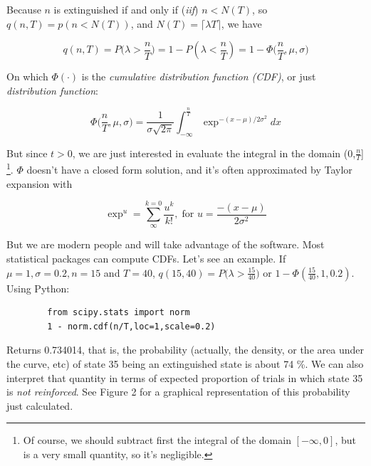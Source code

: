 \documentclass[11pt]{article}
\begin{document}
Because $n$ is extinguished if and only if (\textit{iif}) $n < N(T)$, so $q(n,T) = p(n < N(T))$,
and $N(T) = \lceil \lambda T \rceil$, we have

    \[
        q(n,T) = P \Big(\lambda > \frac{n}{T}\Big) = 1 - P(\lambda < \frac{n}{T}) = 1 - \Phi \Big (\frac{n}{T}, \mu, \sigma \Big)
    \]


On which $\Phi (\cdot)$ is the \textit{cumulative distribution function (CDF)}, or just \textit{distribution function}:

    \[
        \Phi \Big( \frac{n}{T}, \mu, \sigma \Big) = \frac{1}{\sigma \sqrt{2 \pi}} \int_{-\infty}^{\frac{n}{T}} \exp^{-(x - \mu)/2\sigma^2}dx
    \]

But since $t > 0$, we are just interested in evaluate the integral in the domain (0,$\frac{n}{T}$] \footnote{Of course,
    we should subtract first the integral of the domain $[-\infty, 0]$, but is a very small quantity, so it's negligible.}.
$\Phi$ doesn't have a closed form solution, and it's often approximated by Taylor expansion with

    \[
        \exp^{u} = \sum^{k=0}_{\infty} \frac{u^k}{k!}, \; \text{for } u = \frac{-(x - \mu)}{2 \sigma^2}
    \]

But we are modern people and will take advantage of the software.
Most statistical packages can compute CDFs.
Let's see an example.
If $\mu = 1, \sigma = 0.2, n = 15$
and $T = 40$, $q(15,40) = P \Big( \lambda > \frac{15}{40} \Big)$ or $1 - \Phi(\frac{15}{40},1,0.2)$. Using \textsf{Python}:

    \begin{verbatim}
        from scipy.stats import norm
        1 - norm.cdf(n/T,loc=1,scale=0.2)
    \end{verbatim}

Returns 0.734014, that is, the probability (actually, the density, or the area under the curve, etc) of state 35 being an extinguished state is about 74 \%.
    We can also interpret that quantity in terms of expected proportion of trials in which state 35 is \textit{not reinforced}.
    See Figure 2 for a graphical representation of this probability just calculated.
\end{document}
